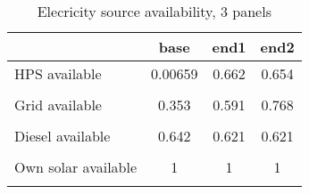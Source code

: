 \begin{table}[htbp]\centering
\caption{Elecricity source availability, 3 panels}
\begin{tabular}{l*{3}{c}}
\toprule
                &     base&     end1&     end2\\
\midrule
HPS available   &  0.00659&    0.662&    0.654\\
                &         &         &         \\
\addlinespace
Grid available  &    0.353&    0.591&    0.768\\
                &         &         &         \\
\addlinespace
Diesel available&    0.642&    0.621&    0.621\\
                &         &         &         \\
\addlinespace
Own solar available&        1&        1&        1\\
                &         &         &         \\
\bottomrule
\end{tabular}
\end{table}

